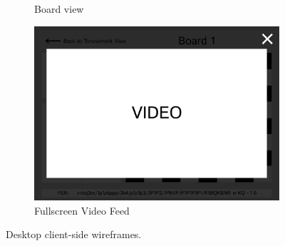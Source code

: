 \begin{figure}[h!]
\begin{subfigure}[h!]{0.40\linewidth}
        \caption{Board view}
        \label{fig:desktop-board-view}
    \end{subfigure}

    \begin{subfigure}[h!]{0.40\linewidth}
        \centering
        \includegraphics[width=\linewidth]{figures/methods/wireframes/desktop-full-screen-video-view.png}
        \caption{Fullscreen Video Feed}
        \label{fig:desktop-fullscreen-video}
    \end{subfigure}
    
    \caption[Desktop client-side wireframes]{Desktop client-side wireframes.}
    \label{fig:desktop-view-group}
\end{figure}


